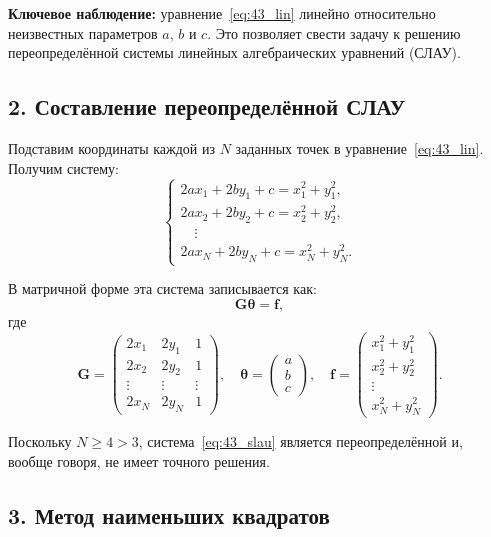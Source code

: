 \documentclass{article}
\begin{document}
\textbf{Ключевое наблюдение:} уравнение~\eqref{eq:43_lin} линейно относительно неизвестных параметров $a$, $b$ и $c$. Это позволяет свести задачу к решению переопределённой системы линейных алгебраических уравнений (СЛАУ).

\subsection*{2. Составление переопределённой СЛАУ}

Подставим координаты каждой из $N$ заданных точек в уравнение~\eqref{eq:43_lin}. Получим систему:
\begin{equation}
\begin{cases}
2a x_1 + 2b y_1 + c = x_1^2 + y_1^2, \\
2a x_2 + 2b y_2 + c = x_2^2 + y_2^2, \\
\quad \vdots \\
2a x_N + 2b y_N + c = x_N^2 + y_N^2.
\end{cases}
\end{equation}

В матричной форме эта система записывается как:
\begin{equation}
\mathbf{G} \boldsymbol{\theta} = \mathbf{f},
\label{eq:43_slau}
\end{equation}
где
\begin{equation}
\mathbf{G} =
\begin{pmatrix}
2x_1 & 2y_1 & 1 \\
2x_2 & 2y_2 & 1 \\
\vdots & \vdots & \vdots \\
2x_N & 2y_N & 1
\end{pmatrix}, \quad
\boldsymbol{\theta} =
\begin{pmatrix}
a \\ b \\ c
\end{pmatrix}, \quad
\mathbf{f} =
\begin{pmatrix}
x_1^2 + y_1^2 \\
x_2^2 + y_2^2 \\
\vdots \\
x_N^2 + y_N^2
\end{pmatrix}.
\end{equation}

Поскольку $N \geqslant 4 > 3$, система~\eqref{eq:43_slau} является переопределённой и, вообще говоря, не имеет точного решения.

\subsection*{3. Метод наименьших квадратов}
\end{document}
